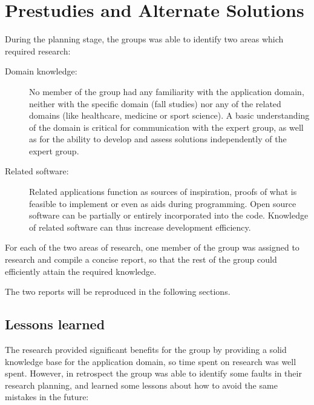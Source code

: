 \chapter{Prestudies and Alternate Solutions}
During the planning stage, the groups was able to identify two areas which required research:
\begin{description}
\item[Domain knowledge:] No member of the group had any familiarity with the application domain, neither with the specific domain (fall studies) nor any of the related domains (like healthcare, medicine or sport science). A basic understanding of the domain is critical for communication with the expert group, as well as for the ability to develop and assess solutions independently of the expert group.
\item[Related software:] Related applications function as sources of inspiration, proofs of what is feasible to implement or even as aids during programming. Open source software can be partially or entirely incorporated into the code. Knowledge of related software can thus increase development efficiency.  
\end{description}
For each of the two areas of research, one member of the group was assigned to research and compile a concise report, so that the rest of the group could efficiently attain the required knowledge.   

The two reports will be reproduced in the following sections.








\section{Lessons learned}
The research provided significant benefits for the group by providing a solid knowledge base for the application domain, so time spent on research was well spent. However, in retrospect the group was able to identify some faults in their research planning, and learned some lessons about how to avoid the same mistakes in the future:

